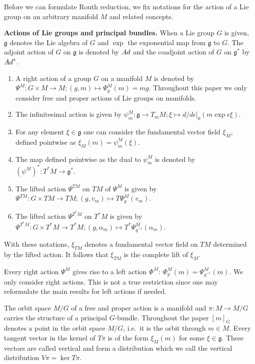 \documentclass[11pt]{article}
\newcommand{\e}{\epsilon}
\newcommand{\lag}{\mathfrak{g}}
\newcommand{\ractie}{\psi}
\begin{document}
Before we can formulate Routh reduction, we f\/ix notations for the action of a Lie group on an arbitrary manifold $M$ and related concepts.

{\bf Actions of Lie groups and principal bundles.}  When a Lie group $G$ is given,  $\lag$ denotes the Lie algebra of $G$ and $\exp$ the exponential map from $\lag$ to $G$. The adjoint action of $G$ on $\lag$ is denoted by ${\rm Ad}$ and the coadjoint action of $G$ on $\lag^*$ by ${\rm Ad}^*$.

\begin{definition} \label{def:acties}\mbox{}
\begin{enumerate}\itemsep=0pt
\item A right action of a group $G$ on a manifold $M$ is denoted by $\Psi^M: G\times M\to M; (g,m)\mapsto \Psi^M_g(m)= mg$. Throughout this paper we only consider free and proper actions of Lie groups on manifolds.
\item  The inf\/initesimal action is given by  $\ractie^M_m:\lag\to T_mM; \xi \mapsto d/d\e|_0 (m\exp \e\xi)$.
\item For any element $\xi \in \lag$ one can consider the fundamental vector f\/ield $\xi_M$, def\/ined pointwise as $\xi_M(m) = \ractie^M_m(\xi)$.
\item The map def\/ined pointwise as the dual to $\ractie^M_m$ is denoted by $(\ractie^M)^*: T^*M \to \lag^*$.
\item The lifted action $\Psi^{TM}$ on $TM$ of $\Psi^M$ is given by $\Psi^{TM}: G\times TM \to TM; (g,v_m) \mapsto T\Psi^M_g(v_m)$.
\item The lifted action $\Psi^{T^*M}$ on $T^*M$ is given by $\Psi^{T^*M}: G\times T^*M \to T^*M; (g,\alpha_m) \mapsto T^*\Psi^M_{g^{-1}}(\alpha_m)$.
\end{enumerate}
\end{definition}
With these notations, $\xi_{TM}$ denotes a fundamental vector f\/ield on $TM$ determined by the lifted action. It follows that $\xi_{TM}$ is the complete lift of $\xi_M$.

Every right action $\Psi^M$ gives rise to a left action $\Phi^M$: $\Phi^M_{g}(m) = \Psi^M_{g^{-1}}(m)$. We only consider right actions. This is not a true restriction since one may reformulate the main results for left actions if needed.

The orbit space $M/G$ of a free and proper action is a manifold and $\pi:M\to M/G$ carries the structure of a principal $G$-bundle. Throughout the paper $[m]_G$ denotes a point in the orbit space $M/G$, i.e.\ it is the orbit through $m\in M$.  Every tangent vector in the kernel of $T\pi$ is of the form $\xi_M(m)$ for some $\xi\in\lag$. These vectors are called vertical and form a distribution which we call the vertical distribution $V\pi=\ker T\pi$.
\end{document}
